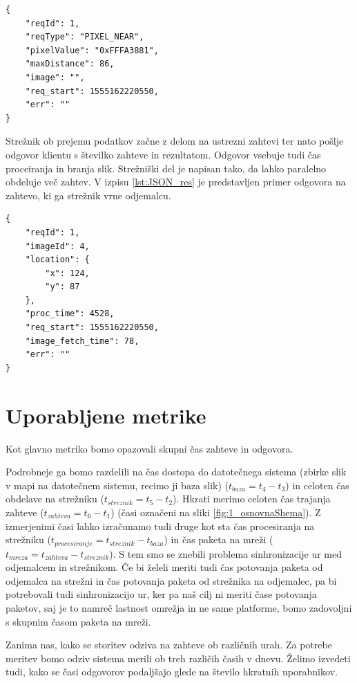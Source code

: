 \begin{lstlisting}[caption={Primer JSON zahteve},label={lst:JSON_req}]
{
	"reqId": 1,
	"reqType": "PIXEL_NEAR",
	"pixelValue": "0xFFFA3881",
	"maxDistance": 86,
	"image": "",
	"req_start": 1555162220550,
	"err": ""
}
\end{lstlisting}

Strežnik ob prejemu podatkov začne z delom na ustrezni zahtevi ter nato pošlje odgovor klientu s številko zahteve in rezultatom. Odgovor vsebuje tudi čas proceiranja in branja slik. Strežniški del je napisan tako, da lahko paralelno obdeluje več zahtev. V izpisu  \ref{lst:JSON_res} je predstavljen primer odgovora na zahtevo, ki ga strežnik vrne odjemalcu.

\begin{lstlisting}[caption={Primer JSON zahteve},label={lst:JSON_res}]
{
	"reqId": 1,
	"imageId": 4,
	"location": {
		"x": 124,
		"y": 87	
	},
	"proc_time": 4528,
	"req_start": 1555162220550,
	"image_fetch_time": 78,
	"err": ""
}
\end{lstlisting}

\section{Uporabljene metrike}

Kot glavno metriko bomo opazovali skupni čas zahteve in odgovora.

Podrobneje ga bomo razdelili na čas dostopa do datotečnega sistema (zbirke slik v mapi na datotečnem sistemu, recimo ji baza slik) ($t_{baza} = t_4 - t_3$) in celoten čas obdelave na strežniku ($t_{streznik} = t_5 - t_2$). Hkrati merimo celoten čas trajanja zahteve ($t_{zahteva} = t_6 - t_1$) (časi označeni na sliki \ref{fig:1_osnovnaShema}). Z izmerjenimi časi lahko izračunamo tudi druge kot sta čas procesiranja na strežniku ($t_{procesiranje} = t_{streznik} - t_{baza}$) in čas paketa na mreži ($t_{mreza} = t_{zahteva} - t_{streznik}$). S tem smo se znebili problema sinhronizacije ur med odjemalcem in strežnikom. Če bi želeli meriti tudi čas potovanja paketa od odjemalca na strežni in čas potovanja paketa od strežnika na odjemalec, pa bi potrebovali tudi sinhronizacijo ur, ker pa naš cilj ni meriti čase potovanja paketov, saj je to namreč lastnost omrežja in ne same platforme, bomo zadovoljni s skupnim časom paketa na mreži.

Zanima nas, kako se storitev odziva na zahteve ob različnih urah. Za potrebe meritev bomo odziv sistema merili ob treh različih časih v dnevu. Želimo izvedeti tudi, kako se časi odgovorov podaljšajo glede na število hkratnih uporabnikov.

